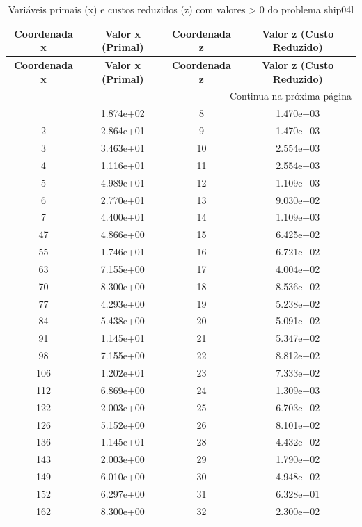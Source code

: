 \documentclass[12pt]{article}
\begin{document}
\begin{longtable}{@{}cccc@{}}
\caption{Variáveis primais (x) e custos reduzidos (z) com valores > 0 do problema ship04l} \\
\toprule
\textbf{Coordenada x} & \textbf{Valor x (Primal)} & \textbf{Coordenada z} & \textbf{Valor z (Custo Reduzido)} \\
\midrule
\endfirsthead

\toprule
\textbf{Coordenada x} & \textbf{Valor x (Primal)} & \textbf{Coordenada z} & \textbf{Valor z (Custo Reduzido)} \\
\midrule
\endhead

\midrule \multicolumn{4}{r}{{Continua na próxima página}} \\ \midrule
\endfoot

\bottomrule
\endlastfoot
1 & 1.874e+02 & 8 & 1.470e+03 \\
2 & 2.864e+01 & 9 & 1.470e+03 \\
3 & 3.463e+01 & 10 & 2.554e+03 \\
4 & 1.116e+01 & 11 & 2.554e+03 \\
5 & 4.989e+01 & 12 & 1.109e+03 \\
6 & 2.770e+01 & 13 & 9.030e+02 \\
7 & 4.400e+01 & 14 & 1.109e+03 \\
47 & 4.866e+00 & 15 & 6.425e+02 \\
55 & 1.746e+01 & 16 & 6.721e+02 \\
63 & 7.155e+00 & 17 & 4.004e+02 \\
70 & 8.300e+00 & 18 & 8.536e+02 \\
77 & 4.293e+00 & 19 & 5.238e+02 \\
84 & 5.438e+00 & 20 & 5.091e+02 \\
91 & 1.145e+01 & 21 & 5.347e+02 \\
98 & 7.155e+00 & 22 & 8.812e+02 \\
106 & 1.202e+01 & 23 & 7.333e+02 \\
112 & 6.869e+00 & 24 & 1.309e+03 \\
122 & 2.003e+00 & 25 & 6.703e+02 \\
126 & 5.152e+00 & 26 & 8.101e+02 \\
136 & 1.145e+01 & 28 & 4.432e+02 \\
143 & 2.003e+00 & 29 & 1.790e+02 \\
149 & 6.010e+00 & 30 & 4.948e+02 \\
152 & 6.297e+00 & 31 & 6.328e+01 \\
162 & 8.300e+00 & 32 & 2.300e+02 \\

\end{longtable}
\end{document}
